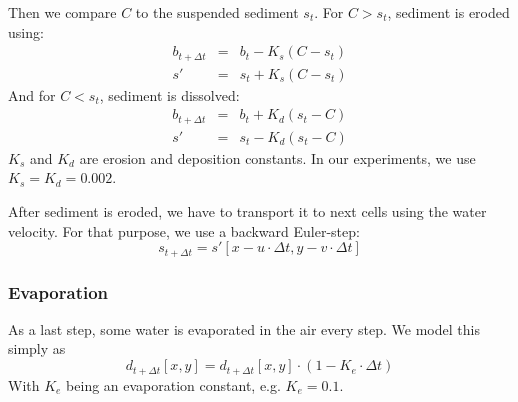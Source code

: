 \documentclass[journal, letterpaper]{IEEEtran}
\begin{document}
Then we compare $C$ to the suspended sediment $s_t$.
For $C>s_t$, sediment is eroded using:
\begin{equation}
\begin{array}{rcl}
	b_{t+\Delta t} &=& b_t - K_s (C-s_t) \\
	s' &=& s_t + K_s (C-s_t)
\end{array}
\label{eq:ErosionSediment3_1}
\end{equation}
And for $C<s_t$, sediment is dissolved:
\begin{equation}
\begin{array}{rcl}
	b_{t+\Delta t} &=& b_t + K_d (s_t-C) \\
	s' &=& s_t - K_d (s_t-C)
\end{array}
\label{eq:ErosionSediment3_2}
\end{equation}
$K_s$ and $K_d$ are erosion and deposition constants. In our experiments, we use $K_s=K_d=0.002$.

After sediment is eroded, we have to transport it to next cells using the water velocity. For that purpose, we use a backward Euler-step:
\begin{equation}
	s_{t+\Delta t} = s'[x-u \cdot \Delta t, y - v \cdot \Delta t]
\label{eq:ErosionSediment4}
\end{equation}

\subsubsection{Evaporation}
As a last step, some water is evaporated in the air every step. We model this simply as
\begin{equation}
	d_{t+\Delta t}[x,y] = d_{t+\Delta t}[x,y] \cdot (1-K_e \cdot \Delta t)
\label{eq:ErosionEvaporation}
\end{equation}
With $K_e$ being an evaporation constant, e.g. $K_e=0.1$.
\end{document}

